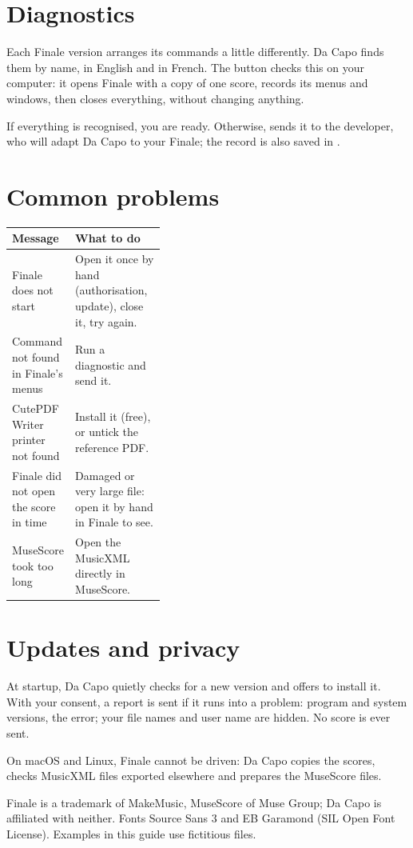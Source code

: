 \section{Diagnostics}\label{sec:diagnostic}

Each Finale version arranges its commands a little differently. Da Capo finds them by name, in
English and in French. The  button checks this on your computer: it opens Finale
with a copy of one score, records its menus and windows, then closes everything, without changing
anything.


If everything is recognised, you are ready. Otherwise,  sends it to the
developer, who will adapt Da Capo to your Finale; the record is also saved in .

\section{Common problems}

\begin{center}
\renewcommand{\arraystretch}{1.35}
\begin{tabularx}{\linewidth}{>{\raggedright\arraybackslash}p{0.38\linewidth} X}
\toprule
\textbf{Message} & \textbf{What to do} \\
\midrule
Finale does not start & Open it once by hand (authorisation, update), close it, try again. \\
Command not found in Finale's menus & Run a diagnostic and send it. \\
CutePDF Writer printer not found & Install it (free), or untick the reference PDF. \\
Finale did not open the score in time & Damaged or very large file: open it by hand in Finale to see. \\
MuseScore took too long & Open the MusicXML directly in MuseScore. \\
\bottomrule
\end{tabularx}
\end{center}

\section{Updates and privacy}

At startup, Da Capo quietly checks for a new version and offers to install it. With your consent, a
report is sent if it runs into a problem: program and system versions, the error; your file names
and user name are hidden. No score is ever sent.

On macOS and Linux, Finale cannot be driven: Da Capo copies the scores, checks MusicXML files
exported elsewhere and prepares the MuseScore files.

\vfill
{\footnotesize\color{summit}\sffamily
Finale is a trademark of MakeMusic, MuseScore of Muse Group; Da Capo is affiliated with neither.
Fonts Source Sans 3 and EB Garamond (SIL Open Font License). Examples in this guide use fictitious files.\par}


